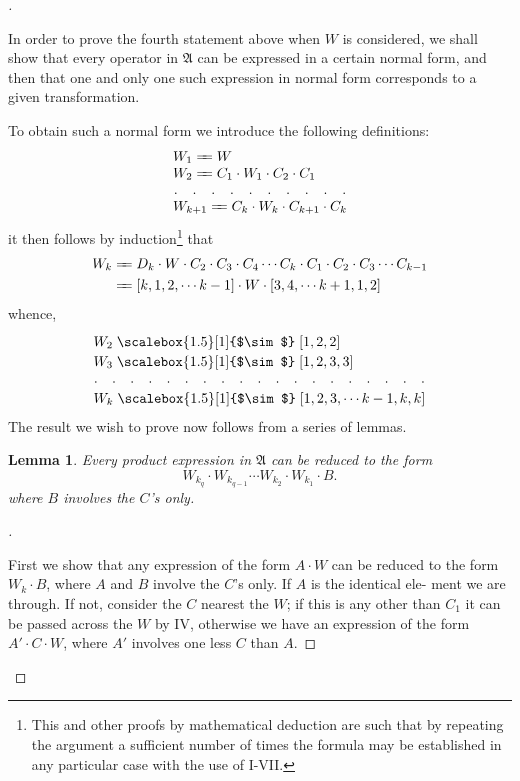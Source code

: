 \documentclass[10pt, twoside]{extarticle}
\def\varequals#1{\mathrel{\leaders\hbox to3pt{$=$\hss}\hskip#1=}}
\newcommand\longeq{\varequals{0.4em}}
\newcommand{\widesim}[2][1.5]{
  \mathrel{\overset{#2}{\scalebox{#1}[1]{$\sim$}}}
}
\newcommand\longsim{\widesim{}}
\theoremstyle{breaktheorem}
\theoremstyle{mylemma}
\newtheorem{lemma}{Lemma}
\theoremstyle{mydefinition}
\theoremstyle{mycorollary}
\newenvironment{proofnewlineindent}[1][\proofname]{%
  \begin{proof}[\indent#1]$ $\par\nobreak\ignorespaces
}{%
  \end{proof}
}
\begin{document}
\begin{proofnewlineindent}
In order to prove the fourth statement above when \(W\) is considered, we
shall show that every operator in \(\mathfrak{A}\) can be expressed in a certain normal
form, and then that one and only one such expression in normal form
corresponds to a given transformation.

To obtain such a normal form we introduce the following definitions:
\begin{equation*}
  \renewcommand{\arraycolsep}{0pt}%
  \begin{array}{rl}
    &W_1 \longeq W \\
    &W_2 \longeq C_1 \cdot W_1 \cdot C_2 \cdot C_1 \\
    \hdotsfor[6]{2} \\
    &W_{k+1} \longeq C_k \cdot W_k \cdot C_{k+1} \cdot C_k
  \end{array}
\end{equation*}
it then follows by induction\footnote{This and other proofs by mathematical deduction are such that by repeating the argument a sufficient number of times the formula may be established in any particular case with the use of I-VII.} that
\begin{align*}
  W_k &\longeq D_k \cdot W \cdot C_2 \cdot C_3 \cdot C_4 \cdots C_k \cdot C_1 \cdot C_2 \cdot C_3 \cdots C_{k-1} \\
  &\longeq [k, 1, 2, \cdots k-1] \cdot W \cdot [3, 4, \cdots k+1, 1, 2]
\end{align*}
whence,
\begin{equation*}
  \renewcommand{\arraycolsep}{0pt}%
  \begin{array}{rl}
  &W_2 \longsim [1, 2, 2] \\
  &W_3 \longsim [1, 2, 3, 3] \\
  \hdotsfor[6]{2} \\
  &W_k \longsim [1, 2, 3, \cdots k-1, k, k]
  \end{array}
\end{equation*}
The result we wish to prove now follows from a series of lemmas.

\begin{lemma}
  \label{lemma:1}
  Every product expression in \(\mathfrak{A}\) can be reduced to the form
  \begin{equation}
    \label{eq:product_reduction}
    W_{k_q} \cdot W_{k_{q-1}} \cdots W_{k_2} \cdot W_{k_1} \cdot B.
  \end{equation}
  where \(B\) involves the \(C\)'s only.
\end{lemma}
\begin{proofnewlineindent}
First we show that any expression of the form \(A \cdot W\) can be reduced to the
form \(W_k \cdot B\), where \(A\) and \(B\) involve the \(C\)'s only. If \(A\) is the identical ele-
ment we are through. If not, consider the \(C\) nearest the \(W\); if this is any
other than \(C_1\) it can be passed across the \(W\) by IV, otherwise we have an
expression of the form \(A' \cdot C \cdot W\), where \(A'\) involves one less \(C\) than \(A\).


\end{proofnewlineindent}
\end{proofnewlineindent}
\end{document}

